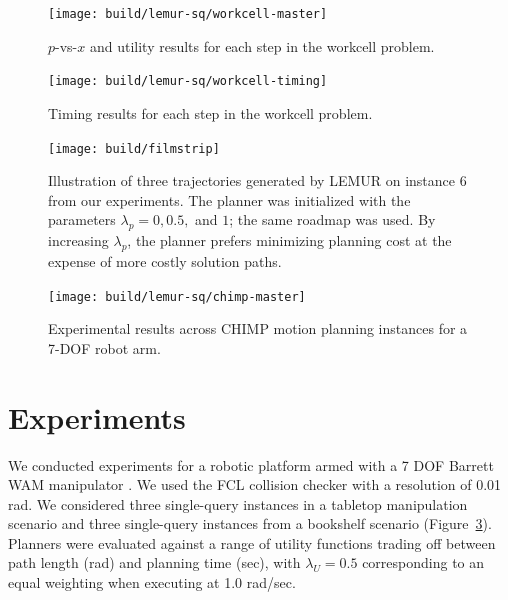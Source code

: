 \begin{figure}
   \begin{widepage}
   \centering   
   \texttt{[image: build/lemur-sq/workcell-master]}
   \end{widepage}
   \caption{$p$-vs-$x$ and utility results for each step in the
      workcell problem.}
   \label{fig:lemur:sq-workcell-master}
\end{figure}

\begin{figure}
   \begin{widepage}
   \centering   
   \texttt{[image: build/lemur-sq/workcell-timing]}
   \end{widepage}
   \caption{Timing results for each step in the workcell problem.}
   \label{fig:lemur:sq-workcell-timing}
\end{figure}

\begin{figure}
   \centering
   \texttt{[image: build/filmstrip]}
   \caption{Illustration of three trajectories generated by LEMUR
      on instance 6 from our experiments.
      The planner was initialized with the parameters
      $\lambda_p = 0, 0.5,$ and $1$;
      the same roadmap was used.
      By increasing $\lambda_p$, the planner prefers minimizing
      planning cost at the expense of more costly solution paths.}
   \label{fig:filmstrip}
\end{figure}

\begin{figure}
   \centering   
   \texttt{[image: build/lemur-sq/chimp-master]}
   \caption[]{Experimental results across CHIMP motion planning
      instances for a 7-DOF robot arm.}
\end{figure}

\section{Experiments}
\label{sec:experiments}

We conducted experiments for a robotic platform armed with a
7 DOF Barrett WAM manipulator \citep{salisbury1988wam}.
We used the FCL collision checker \citep{jiapan2012fcl} with a
resolution of 0.01 rad.
We considered three single-query instances in a tabletop
manipulation scenario
and three single-query instances from a bookshelf scenario
(Figure~\ref{fig:filmstrip}).
Planners were evaluated against a range of utility functions
trading off between path length (rad) and planning time (sec),
with $\lambda_U = 0.5$ corresponding to an equal weighting
when executing at 1.0 rad/sec.

